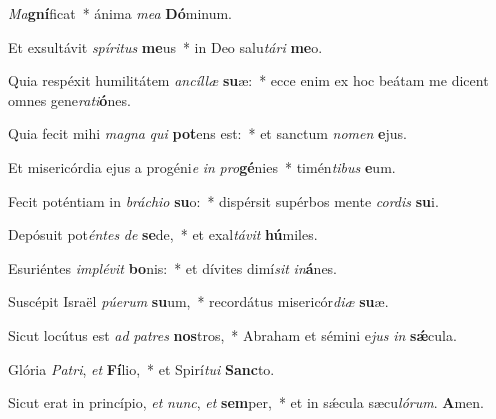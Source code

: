 \item \textit{Ma}\textbf{gní}ficat~* ánima \textit{mea} \textbf{Dó}minum.

\item Et exsultávit \textit{spíritus} \textbf{me}us~* in Deo salu\textit{tári} \textbf{me}o.

\item Quia respéxit humilitátem \textit{ancíllæ} \textbf{su}æ:~* ecce enim ex hoc beátam me dicent omnes gene\textit{rati}\textbf{ó}nes.

\item Quia fecit mihi \textit{magna} \textit{qui} \textbf{pot}ens est:~* et sanctum \textit{nomen} \textbf{e}jus.

\item Et misericórdia ejus a progéni\textit{e} \textit{in} \textit{pro}\textbf{gé}nies~* timén\textit{tibus} \textbf{e}um.

\item Fecit poténtiam in \textit{bráchio} \textbf{su}o:~* dispérsit supérbos mente \textit{cordis} \textbf{su}i.

\item Depósuit pot\textit{éntes} \textit{de} \textbf{se}de,~* et exal\textit{távit} \textbf{hú}miles.

\item Esuriéntes \textit{implévit} \textbf{bo}nis:~* et dívites dimí\textit{sit} \textit{in}\textbf{á}nes.

\item Suscépit Israël \textit{púerum} \textbf{su}um,~* recordátus misericór\textit{diæ} \textbf{su}æ.

\item Sicut locútus est \textit{ad} \textit{patres} \textbf{nos}tros,~* Abraham et sémini e\textit{jus} \textit{in} \textbf{sǽ}cula.

\item Glória \textit{Patri}, \textit{et} \textbf{Fí}lio,~* et Spirí\textit{tui} \textbf{Sanc}to.

\item Sicut erat in princípio, \textit{et} \textit{nunc}, \textit{et} \textbf{sem}per,~* et in sǽcula sæcu\textit{lórum}. \textbf{A}men.
